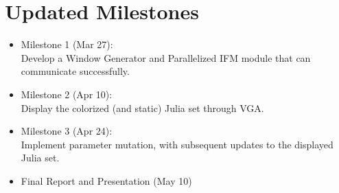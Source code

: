 \documentclass{article}
\begin{document}
\section{Updated Milestones}

\begin{itemize}
\item Milestone 1 (Mar 27): \\
  Develop a Window Generator and
  Parallelized IFM module that can communicate successfully.
\item Milestone 2 (Apr 10): \\
  Display the colorized (and static) Julia set through VGA.
\item Milestone 3 (Apr 24): \\ 
  Implement parameter mutation, with subsequent updates to the
  displayed Julia set.
\item Final Report and Presentation (May 10)
\end{itemize}
\end{document}
